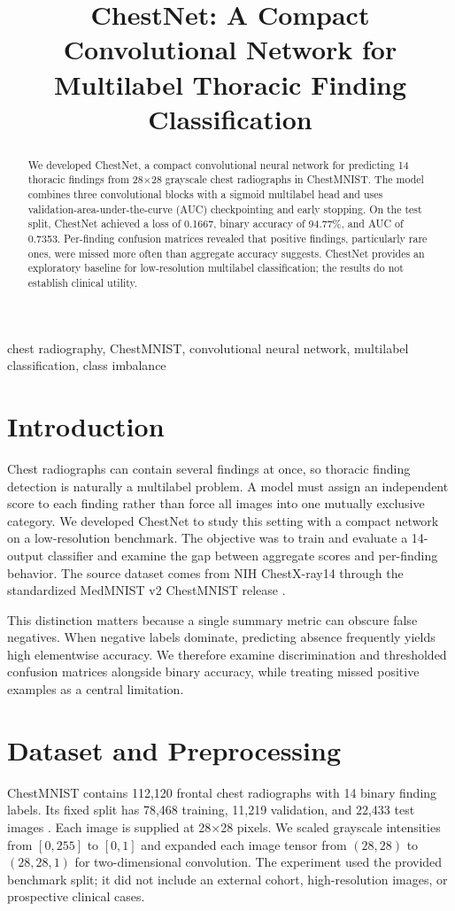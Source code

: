 \documentclass[conference]{IEEEtran}
\begin{document}
\title{ChestNet: A Compact Convolutional Network for Multilabel Thoracic Finding Classification}
\author{}
\maketitle
\begin{abstract}
We developed ChestNet, a compact convolutional neural network for predicting 14 thoracic findings from 28$\times$28 grayscale chest radiographs in ChestMNIST. The model combines three convolutional blocks with a sigmoid multilabel head and uses validation-area-under-the-curve (AUC) checkpointing and early stopping. On the test split, ChestNet achieved a loss of 0.1667, binary accuracy of 94.77\%, and AUC of 0.7353. Per-finding confusion matrices revealed that positive findings, particularly rare ones, were missed more often than aggregate accuracy suggests. ChestNet provides an exploratory baseline for low-resolution multilabel classification; the results do not establish clinical utility.
\end{abstract}
\begin{IEEEkeywords}
chest radiography, ChestMNIST, convolutional neural network, multilabel classification, class imbalance
\end{IEEEkeywords}

\section{Introduction}
Chest radiographs can contain several findings at once, so thoracic finding detection is naturally a multilabel problem. A model must assign an independent score to each finding rather than force all images into one mutually exclusive category. We developed ChestNet to study this setting with a compact network on a low-resolution benchmark. The objective was to train and evaluate a 14-output classifier and examine the gap between aggregate scores and per-finding behavior. The source dataset comes from NIH ChestX-ray14 through the standardized MedMNIST v2 ChestMNIST release \cite{medmnist,wang}.

This distinction matters because a single summary metric can obscure false negatives. When negative labels dominate, predicting absence frequently yields high elementwise accuracy. We therefore examine discrimination and thresholded confusion matrices alongside binary accuracy, while treating missed positive examples as a central limitation.

\section{Dataset and Preprocessing}
ChestMNIST contains 112,120 frontal chest radiographs with 14 binary finding labels. Its fixed split has 78,468 training, 11,219 validation, and 22,433 test images \cite{medmnist}. Each image is supplied at 28$\times$28 pixels. We scaled grayscale intensities from $[0,255]$ to $[0,1]$ and expanded each image tensor from $(28,28)$ to $(28,28,1)$ for two-dimensional convolution. The experiment used the provided benchmark split; it did not include an external cohort, high-resolution images, or prospective clinical cases.
\end{document}
